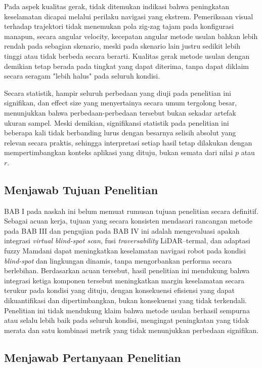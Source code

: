 Pada aspek kualitas gerak, tidak ditemukan indikasi bahwa peningkatan
keselamatan dicapai melalui perilaku navigasi yang ekstrem. Pemeriksaan
visual terhadap trajektori tidak menemukan pola zig-zag tajam pada
konfigurasi manapun, secara angular velocity, kecepatan angular metode
usulan bahkan lebih rendah pada sebagian skenario, meski pada skenario
lain justru sedikit lebih tinggi atau tidak berbeda secara berarti. Kualitas
gerak metode usulan dengan demikian tetap berada pada tingkat yang dapat
diterima, tanpa dapat diklaim secara seragam "lebih halus" pada seluruh
kondisi.

Secara statistik, hampir seluruh perbedaan yang diuji pada penelitian ini
signifikan, dan effect size yang menyertainya secara umum tergolong besar,
menunjukkan bahwa perbedaan-perbedaan tersebut bukan sekadar artefak
ukuran sampel. Meski demikian, signifikansi statistik pada penelitian ini
beberapa kali tidak berbanding lurus dengan besarnya selisih absolut yang
relevan secara praktis, sehingga interpretasi setiap hasil tetap dilakukan
dengan mempertimbangkan konteks aplikasi yang dituju, bukan semata dari
nilai $p$ atau $r$.

\subsection{Menjawab Tujuan Penelitian}

BAB I pada naskah ini belum memuat rumusan tujuan penelitian secara
definitif. Sebagai acuan kerja, tujuan yang secara konsisten mendasari
rancangan metode pada BAB III dan pengujian pada BAB IV ini adalah
mengevaluasi apakah integrasi \textit{virtual blind-spot scan}, fusi
\textit{traversability} LiDAR--termal, dan adaptasi fuzzy Mamdani dapat
meningkatkan keselamatan navigasi robot pada kondisi \textit{blind-spot}
dan lingkungan dinamis, tanpa mengorbankan performa secara berlebihan.
Berdasarkan acuan tersebut, hasil penelitian ini mendukung bahwa integrasi
ketiga komponen tersebut meningkatkan margin keselamatan secara terukur
pada kondisi yang dituju, dengan konsekuensi efisiensi yang dapat
dikuantifikasi dan dipertimbangkan, bukan konsekuensi yang tidak terkendali.
Penelitian ini tidak mendukung klaim bahwa metode usulan berhasil sempurna
atau selalu lebih baik pada seluruh kondisi, mengingat peningkatan yang
tidak merata dan satu kombinasi metrik yang tidak menunjukkan perbedaan
signifikan.

\subsection{Menjawab Pertanyaan Penelitian}

